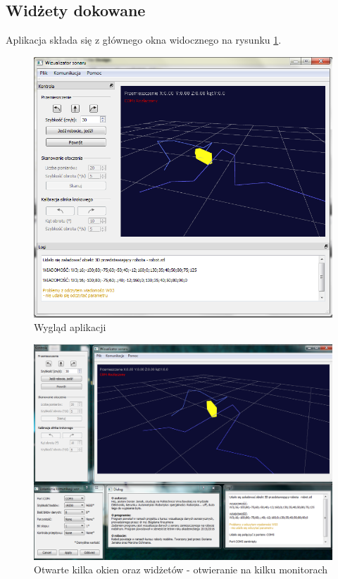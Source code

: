 \documentclass[a4paper]{article}
\begin{document}
\subsection{Widżety dokowane}
Aplikacja składa się z głównego okna widocznego na rysunku \ref{app2}.
\begin{figure}
\centering
\includegraphics[width=\linewidth]{app2.png}
\caption{Wygląd aplikacji}
\label{app2}
\end{figure}
\begin{figure}[p]
\centering
\includegraphics[width=\textheight, angle=90]{app5.png}
\caption{Otwarte kilka okien oraz widżetów - otwieranie na kilku monitorach}
\label{app5}
\end{figure}
\end{document}
